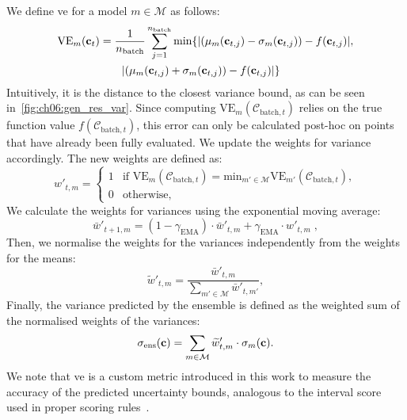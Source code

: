 We define \gls{ve} for a model $m\in \mathcal M$ as follows:
\begin{equation}
  \begin{aligned}
    \text{VE}_m(\mathbf{c}_t) &= \frac{1}{n_{\mathrm{batch}}}\sum_{j=1}^{n_{\mathrm{batch}}} \min \{|(\mu_m(\mathbf{c}_{t,j}) - \sigma_m(\mathbf{c}_{t,j}))- f(\mathbf{c}_{t,j})|,\\
      &\qquad |(\mu_m(\mathbf{c}_{t,j}) + \sigma_m(\mathbf{c}_{t,j}))- f(\mathbf{c}_{t,j})|\}
  \end{aligned}
\end{equation}
Intuitively, it is the distance to the closest variance bound, as can be seen in~\cref{fig:ch06:gen_res_var}.
Since computing $\text{VE}_m(\mathcal C_{\mathrm{batch},t})$ relies on the true function value $f(\mathcal C_{\mathrm{batch},t})$, this error can only be calculated post-hoc on points that have already been fully evaluated.
We update the weights for variance accordingly.
The new weights are defined as:
\begin{equation}\label{eq:ch06:weight_var}
    {w}'_{t,m}=
    \begin{cases}
        1 & \text{if } \text{VE}_m(\mathcal C_{\mathrm{batch},t})=\text{min}_{m\prime\in\mathcal M} \text{VE}_{m\prime}(\mathcal C_{\mathrm{batch},t}),  \\
        0 & \text{otherwise},
    \end{cases}
\end{equation}
We calculate the weights for variances using the exponential moving average:
\begin{equation}
    \bar{w}'_{t+1,m} = (1-\gamma_{\mathrm{EMA}}) \cdot \bar{w}'_{t, m} + \gamma_{\mathrm{EMA}}  \cdot {w}'_{t,m} \; ,
    \label{eq:ch06:weight_ema_var}
\end{equation}
Then, we normalise the weights for the variances independently from the weights for the means:
\begin{equation}
    \widetilde{w}'_{t,m} = \frac{\bar{w}'_{t,m}}{\sum_{m\prime\in\mathcal M}{\bar{w}'_{t,m\prime}}},
\end{equation}
Finally, the variance predicted by the ensemble is defined as the weighted sum of the normalised weights of the variances:
\begin{equation}
    \sigma_{\text{ens}}(\mathbf{c})= \sum_{m\in \mathcal M} \widetilde{w}'_{t,m} \cdot \sigma_{m}(\mathbf{c}).
    \label{eq:ch06:ens_sigma_var}
\end{equation}
We note that \gls{ve} is a custom metric introduced in this work to measure the accuracy of the predicted uncertainty bounds, analogous to the interval score used in proper scoring rules~\citep{GneRaf07}.

